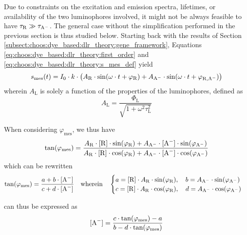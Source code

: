 Due to constraints on the excitation and emission spectra, lifetimes, or availability of the two luminophores involved, it might not be always feasible to have $\tau_\mathrm{R} \gg \tau_\mathrm{A^{\smash{-}}}$. The general case without the simplification performed in the previous section is thus studied below. Starting back with the results of Section \ref{subsect:choos:dye_based:dlr_theory:gene_framework}, Equations \ref{eq:choos:dye_based:dlr_theory:first_order} and \ref{eq:choos:dye_based:dlr_theory:s_mes_def} yield
\begin{equation}
	s_\text{mes}(t) = I_0\cdot k \cdot \left( A_\mathrm{R} \cdot \sin(\omega \cdot t + \varphi_\mathrm{R}) + A_\mathrm{A^{\smash{-}}} \cdot \sin(\omega \cdot t + \varphi_\mathrm{R, A^-}) \right)
\end{equation}
wherein $A_\mathrm{L}$ is solely a function of the properties of the luminophores, defined as
\begin{equation}
	A_\mathrm{L} = \frac{\Phi_\mathrm{L}}{\sqrt{1+ \omega^2 \tau_\mathrm{L}^2}}
\end{equation}

When considering $\varphi_\text{mes}$, we thus have
\begin{equation}
	\tan(\varphi_\text{mes}) = \frac{
		A_\mathrm{R} \cdot \ce{[R]} \cdot \sin(\varphi_\mathrm{R}) + A_\mathrm{A\spminus} \cdot \ce{[A^-]} \cdot \sin(\varphi_\mathrm{A\spminus})
		}{
		A_\mathrm{R} \cdot \ce{[R]} \cdot \cos(\varphi_\mathrm{R}) + A_\mathrm{A\spminus} \cdot \ce{[A^-]} \cdot \cos(\varphi_\mathrm{A\spminus})
		}
\end{equation}
which can be rewritten
\begin{equation}
	\tan(\varphi_\text{mes}) = \frac{a + b \cdot \ce{[A^-]} }{c + d \cdot \ce{[A^-]} } \quad \text{wherein} \quad 
	\begin{cases}
		a = \ce{[R]} \cdot A_\mathrm{R} \cdot \sin(\varphi_\mathrm{R}), \quad b = A_\mathrm{A\spminus} \cdot \sin(\varphi_\mathrm{A\spminus}) \\
		c = \ce{[R]} \cdot A_\mathrm{R} \cdot \cos(\varphi_\mathrm{R}), \quad d = A_\mathrm{A\spminus} \cdot \cos(\varphi_\mathrm{A\spminus})
	\end{cases}
\end{equation}

\ce{[A^-]} can thus be expressed as
\begin{equation}\label{eq:gene_phi_mes}
	\ce{[A^-]} = \frac{c \cdot \tan( \varphi_\text{mes}) - a}{b - d \cdot \tan(\varphi_\text{mes})}
\end{equation}

